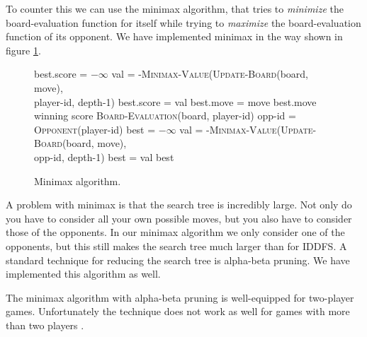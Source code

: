 To counter this we can use the minimax algorithm, that tries to
\emph{minimize} the board-evaluation function for itself while trying
to \emph{maximize} the board-evaluation function of its opponent. We
have implemented minimax in the way shown in figure \ref{minimax}.

\begin{figure}
\begin{algorithmic}
  \State best.score = $-\infty$
    \State val = -\textsc{Minimax-Value}(\textsc{Update-Board}(board, move), \\
    \hspace{160pt} player-id, depth-1)
      \State best.score = val
      \State best.move = move
    \EndIf
  \EndFor
  \State \Return best.move
\EndFunction
\\
  \State \Return winning score
  \State \Return \textsc{Board-Evaluation}(board, player-id)
\Else
  \State opp-id = \textsc{Opponent}(player-id)
  \State best = $-\infty$
    \State val = -\textsc{Minimax-Value}(\textsc{Update-Board}(board, move), \\
    \hspace{180pt} opp-id, depth-1)
      \State best = val
    \EndIf
  \EndFor
  \State \Return best
\EndIf
\EndFunction
\end{algorithmic}
\caption{Minimax algorithm.}
\label{minimax}
\end{figure}

A problem with minimax is that the search tree is incredibly large.
Not only do you have to consider all your own possible moves, but you
also have to consider those of the opponents. In our minimax algorithm
we only consider one of the opponents, but this still makes the search
tree much larger than for IDDFS. A standard technique for reducing the
search tree is alpha-beta pruning. We have implemented this algorithm
as well.

The minimax algorithm with alpha-beta pruning is well-equipped for
two-player games. Unfortunately the technique does not work as well
for games with more than two players \cite{Korf199199}.


